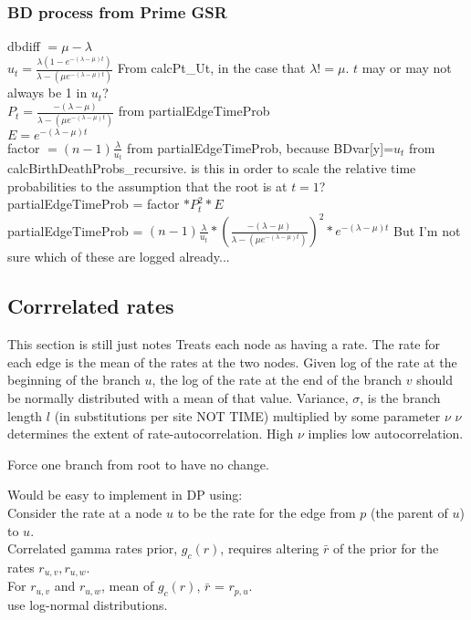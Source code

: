 \documentclass{llncs}
\newcommand{\ejmcomment}[1]{{\color{green} #1}}
\begin{document}
\subsubsection{BD process from Prime GSR\\}

dbdiff $= \mu - \lambda$\\
$u_t =\frac{\lambda(1-e^{-(\lambda-\mu)t})}{\lambda-(\mu e^{-(\lambda - \mu)t})}$ From calcPt\_Ut, in the case that $\lambda != \mu$. \ejmcomment{$t$ may or may not always be 1 in $u_t$?}\\
$P_t = \frac{-(\lambda-\mu)}{\lambda-(\mu e^{-(\lambda - \mu)t})}$ from partialEdgeTimeProb\\
$E=e^{-(\lambda-\mu)t}$\\
factor $= (n-1)\frac{\lambda}{u_t}$ from partialEdgeTimeProb, because BDvar[y]=$u_t$ from calcBirthDeathProbs\_recursive. 
\ejmcomment{is this in order to scale the relative time probabilities to the assumption that the root is at $t=1$?}\\
partialEdgeTimeProb = factor $*P_t^2 *E$\\
partialEdgeTimeProb = $(n-1)\frac{\lambda}{u_t} * ( \frac{-(\lambda-\mu)}{\lambda-(\mu e^{-(\lambda - \mu)t})})^2 * e^{-(\lambda-\mu)t}$\ejmcomment{But I'm not sure which of these are logged already...}\\

\subsection{Corrrelated rates \cite{Kishino2001}}\ejmcomment{This section is still just notes}
Treats each node as having a rate.
The rate for each edge is the mean of the rates at the two nodes.
Given log  of the rate at the beginning of the branch $u$, the log of the rate at the end of the branch $v$ should be normally distributed with a mean of that value.
Variance, $\sigma$, is the branch length $l$ (in substitutions per site NOT TIME) multiplied by some parameter $\nu$
$\nu$ determines the extent of rate-autocorrelation. High $\nu$ implies low autocorrelation. 

Force one branch from root to have no change.


Would be easy to implement in DP using:\\
Consider the rate at a node $u$ to be the rate for the edge from $p$ (the parent of $u$) to $u$.\\
Correlated gamma rates prior, $g_c(r)$, requires altering $\bar{r}$ of the prior for the rates $r_{u,v}, r_{u,w}$.\\
For $r_{u,v}$ and $r_{u,w}$, mean of $g_c(r)$, $\bar{r}$ = $r_{p,u}$.\\
\cite{Kishino2001} use log-normal distributions.\\





\end{document}
